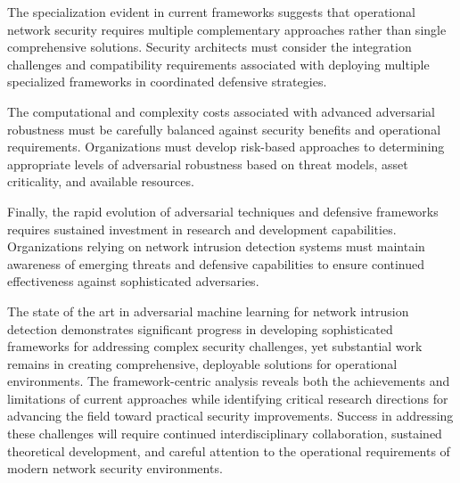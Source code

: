 The specialization evident in current frameworks suggests that operational network security requires multiple complementary approaches rather than single comprehensive solutions. Security architects must consider the integration challenges and compatibility requirements associated with deploying multiple specialized frameworks in coordinated defensive strategies.

The computational and complexity costs associated with advanced adversarial robustness must be carefully balanced against security benefits and operational requirements. Organizations must develop risk-based approaches to determining appropriate levels of adversarial robustness based on threat models, asset criticality, and available resources.

Finally, the rapid evolution of adversarial techniques and defensive frameworks requires sustained investment in research and development capabilities. Organizations relying on network intrusion detection systems must maintain awareness of emerging threats and defensive capabilities to ensure continued effectiveness against sophisticated adversaries.

The state of the art in adversarial machine learning for network intrusion detection demonstrates significant progress in developing sophisticated frameworks for addressing complex security challenges, yet substantial work remains in creating comprehensive, deployable solutions for operational environments. The framework-centric analysis reveals both the achievements and limitations of current approaches while identifying critical research directions for advancing the field toward practical security improvements. Success in addressing these challenges will require continued interdisciplinary collaboration, sustained theoretical development, and careful attention to the operational requirements of modern network security environments.
